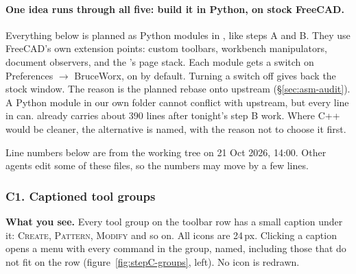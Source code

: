 \paragraph{One idea runs through all five: build it in Python, on stock FreeCAD.}
Everything below is planned as Python modules in , like steps A and B. They use
FreeCAD's own extension points: custom toolbars, workbench manipulators, document observers, and the
's page stack. Each module gets a switch on Preferences $\rightarrow$ BruceWorx, on by default.
Turning a switch off gives back the stock window. The reason is the planned rebase onto upstream 
(\S\ref{sec:asm-audit}). A Python module in our own folder cannot conflict with upstream, but every
\code{[BW]} line in  can.  already carries about 390 \code{[BW]} lines after
tonight's step B work. Where C++ would be cleaner, the alternative is named, with the reason not to choose it
first.

Line numbers below are from the working tree on 21 Oct 2026, 14:00. Other agents edit some of these files, so
the numbers may move by a few lines.

\subsubsection*{C1. Captioned tool groups}

\textbf{What you see.} Every tool group on the toolbar row has a small caption under it: \textsc{Create},
\textsc{Pattern}, \textsc{Modify} and so on. All icons are 24\,px. Clicking a caption opens a menu with every
command in the group, named, including those that do not fit on the row (figure~\ref{fig:stepC-groups}, left). No
icon is redrawn.

